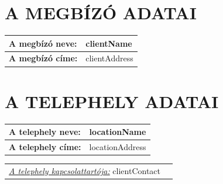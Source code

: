 \documentclass[a4paper,12pt]{article}
\renewcommand{\arraystretch}{0.5}
\begin{document}
	\section{A MEGBÍZÓ ADATAI}
		\begin{adjustwidth}{1cm}{0cm}
			
			\vspace{0.5em} %
			
			\noindent
			\renewcommand{\arraystretch}{1.4} %
			
			\begin{tabularx}{\textwidth}{ | p{4.5cm} | X | } %
				\hline
				\textbf{A megbízó neve:} & \textbf{{{clientName}}} \\ \hline
				\textbf{A megbízó címe:} & {{clientAddress}} \\ \hline
			\end{tabularx}
			
		\end{adjustwidth}
		
	\section{A TELEPHELY ADATAI}
		\begin{adjustwidth}{1cm}{0cm}
			\vspace{0.5em} %
			
			\noindent
			\renewcommand{\arraystretch}{1.4} %
			
			
			\begin{tabularx}{\textwidth}{ | p{4.5cm} | X | } %
				\hline
				\textbf{A telephely neve:} & \textbf{{{locationName}}} \\ \hline
				\textbf{A telephely címe:} & {{locationAddress}} \\ \hline
			\end{tabularx}
			
			\vspace{0.5em} %
			
			\begin{tabular}{ p{5.5cm} p{8cm} } 
				\textit{\underline{A telephely kapcsolattartója:}} {{clientContact}}
			\end{tabular}
			
		\end{adjustwidth}
	
\end{document}
